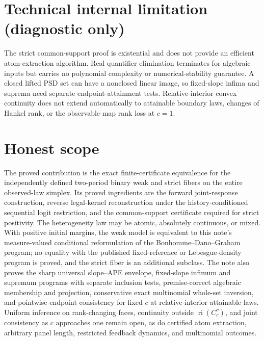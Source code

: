 \documentclass{article}
\begin{document}
\section*{Technical internal limitation (diagnostic only)}

The strict common-support proof is existential and does not provide an efficient atom-extraction algorithm. Real quantifier elimination terminates for algebraic inputs but carries no polynomial complexity or numerical-stability guarantee. A closed lifted PSD set can have a nonclosed linear image, so fixed-slope infima and suprema need separate endpoint-attainment tests. Relative-interior convex continuity does not extend automatically to attainable boundary laws, changes of Hankel rank, or the observable-map rank loss at \(c=1\).

\section{Honest scope}

The proved contribution is the exact finite-certificate equivalence for the independently defined two-period binary weak and strict fibers on the entire observed-law simplex. Its proved ingredients are the forward joint-response construction, reverse legal-kernel reconstruction under the history-conditioned sequential logit restriction, and the common-support certificate required for strict positivity. The heterogeneity law may be atomic, absolutely continuous, or mixed. With positive initial margins, the weak model is equivalent to this note's measure-valued conditional reformulation of the Bonhomme--Dano--Graham program; no equality with the published fixed-reference or Lebesgue-density program is proved, and the strict fiber is an additional subclass. The note also proves the sharp universal slope--APE envelope, fixed-slope infimum and supremum programs with separate inclusion tests, premise-correct algebraic membership and projection, conservative exact multinomial whole-set inversion, and pointwise endpoint consistency for fixed \(c\) at relative-interior attainable laws. Uniform inference on rank-changing faces, continuity outside \(\operatorname{ri}(C_c^v)\), and joint consistency as \(c\) approaches one remain open, as do certified atom extraction, arbitrary panel length, restricted feedback dynamics, and multinomial outcomes.
\end{document}
